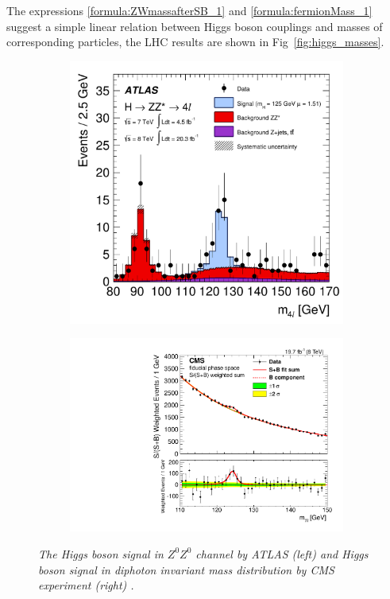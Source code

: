 The expressions \ref{formula:ZWmassafterSB_1} and \ref{formula:fermionMass_1} suggest a simple linear relation between Higgs boson couplings and masses of corresponding particles, the LHC results are shown in Fig~\ref{fig:higgs_masses}.


\begin{figure}[H]
\centering
\begin{subfigure}{0.5\textwidth}
\centering
\includegraphics[width=.90\linewidth]{graphics/m4l_80_170_allYear_125.pdf}

\end{subfigure}%
\begin{subfigure}{0.5\textwidth}
\centering
\includegraphics[width=.90\linewidth]{graphics/CMS-HIG-14-016_Figure_003.pdf}

\end{subfigure}
    \caption{\sl The Higgs boson signal in $Z^0Z^0$ channel by ATLAS (left) \cite{bib:HiggsAtlas2} and Higgs boson signal in diphoton invariant mass distribution by CMS experiment (right) \cite{bib:HiggsCms2}.}
    \label{fig:diphoton}
\end{figure}

